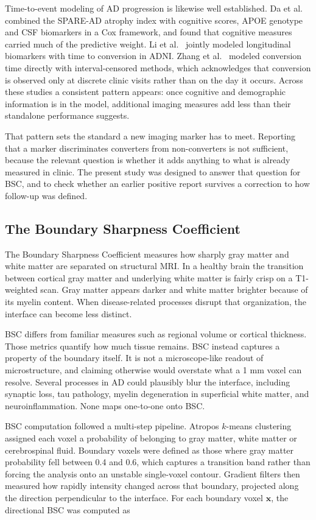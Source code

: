 \documentclass[blue]{ludusofficial}  %
\begin{document}
Time-to-event modeling of AD progression is likewise well established. Da et al.~\cite{da2014integration} combined the SPARE-AD atrophy index with cognitive scores, APOE genotype and CSF biomarkers in a Cox framework, and found that cognitive measures carried much of the predictive weight. Li et al.~\cite{li2017prediction} jointly modeled longitudinal biomarkers with time to conversion in ADNI. Zhang et al.~\cite{zhang2024interval} modeled conversion time directly with interval-censored methods, which acknowledges that conversion is observed only at discrete clinic visits rather than on the day it occurs. Across these studies a consistent pattern appears: once cognitive and demographic information is in the model, additional imaging measures add less than their standalone performance suggests.

That pattern sets the standard a new imaging marker has to meet. Reporting that a marker discriminates converters from non-converters is not sufficient, because the relevant question is whether it adds anything to what is already measured in clinic. The present study was designed to answer that question for BSC, and to check whether an earlier positive report survives a correction to how follow-up was defined.

\subsection{The Boundary Sharpness Coefficient}

The Boundary Sharpness Coefficient measures how sharply gray matter and white matter are separated on structural MRI. In a healthy brain the transition between cortical gray matter and underlying white matter is fairly crisp on a T1-weighted scan. Gray matter appears darker and white matter brighter because of its myelin content. When disease-related processes disrupt that organization, the interface can become less distinct.

BSC differs from familiar measures such as regional volume or cortical thickness. Those metrics quantify how much tissue remains. BSC instead captures a property of the boundary itself. It is not a microscope-like readout of microstructure, and claiming otherwise would overstate what a 1 mm voxel can resolve. Several processes in AD could plausibly blur the interface, including synaptic loss, tau pathology, myelin degeneration in superficial white matter, and neuroinflammation. None maps one-to-one onto BSC.

BSC computation followed a multi-step pipeline. Atropos $k$-means clustering~\cite{avants2011atropos} assigned each voxel a probability of belonging to gray matter, white matter or cerebrospinal fluid. Boundary voxels were defined as those where gray matter probability fell between 0.4 and 0.6, which captures a transition band rather than forcing the analysis onto an unstable single-voxel contour. Gradient filters then measured how rapidly intensity changed across that boundary, projected along the direction perpendicular to the interface. For each boundary voxel $\mathbf{x}$, the directional BSC was computed as
\end{document}
